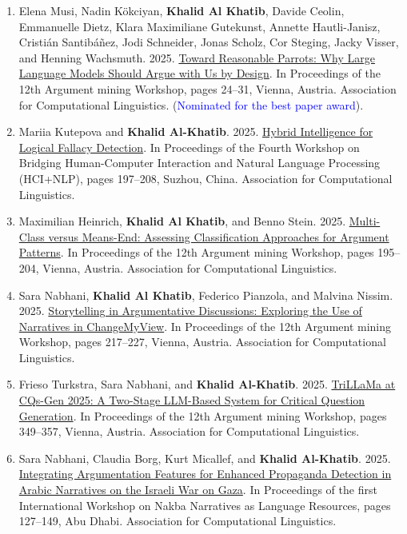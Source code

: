 \begin{enumerate}

\item Elena Musi, Nadin Kökciyan, \textbf{Khalid Al Khatib}, Davide Ceolin, Emmanuelle Dietz, Klara Maximiliane Gutekunst, Annette Hautli-Janisz, Cristián Santibáñez, Jodi Schneider, Jonas Scholz, Cor Steging, Jacky Visser, and Henning Wachsmuth. 2025. \href{https://aclanthology.org/2025.argmining-1.3/}{Toward Reasonable Parrots: Why Large Language Models Should Argue with Us by Design}. In Proceedings of the 12th Argument mining Workshop, pages 24–31, Vienna, Austria. Association for Computational Linguistics. (\textcolor{blue}{Nominated for the best paper award}).
\item Mariia Kutepova and \textbf{Khalid Al-Khatib}. 2025. \href{https://aclanthology.org/2025.hcinlp-1.16/}{Hybrid Intelligence for Logical Fallacy Detection}. In Proceedings of the Fourth Workshop on Bridging Human-Computer Interaction and Natural Language Processing (HCI+NLP), pages 197--208, Suzhou, China. Association for Computational Linguistics.
\item Maximilian Heinrich, \textbf{Khalid Al Khatib}, and Benno Stein. 2025. \href{https://aclanthology.org/2025.argmining-1.19/}{Multi-Class versus Means-End: Assessing Classification Approaches for Argument Patterns}. In Proceedings of the 12th Argument mining Workshop, pages 195–204, Vienna, Austria. Association for Computational Linguistics.
\item Sara Nabhani, \textbf{Khalid Al Khatib}, Federico Pianzola, and Malvina Nissim. 2025. \href{https://aclanthology.org/2025.argmining-1.21/}{Storytelling in Argumentative Discussions: Exploring the Use of Narratives in ChangeMyView}. In Proceedings of the 12th Argument mining Workshop, pages 217–227, Vienna, Austria. Association for Computational Linguistics.
\item Frieso Turkstra, Sara Nabhani, and \textbf{Khalid Al-Khatib}. 2025. \href{https://aclanthology.org/2025.argmining-1.34/}{TriLLaMa at CQs-Gen 2025: A Two-Stage LLM-Based System for Critical Question Generation}. In Proceedings of the 12th Argument mining Workshop, pages 349–357, Vienna, Austria. Association for Computational Linguistics.
\item Sara Nabhani, Claudia Borg, Kurt Micallef, and \textbf{Khalid Al-Khatib}. 2025. \href{https://aclanthology.org/2025.nakbanlp-1.14/}{Integrating Argumentation Features for Enhanced Propaganda Detection in Arabic Narratives on the Israeli War on Gaza}. In Proceedings of the first International Workshop on Nakba Narratives as Language Resources, pages 127–149, Abu Dhabi. Association for Computational Linguistics.

\end{enumerate}
